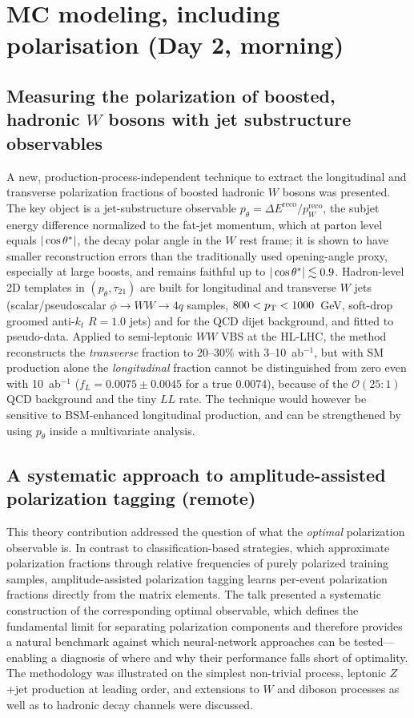 \section{MC modeling, including polarisation (Day 2, morning)}

\subsection{Measuring the polarization of boosted, hadronic $W$ bosons with jet substructure observables}
A new, production-process-independent technique to extract the longitudinal and
transverse polarization fractions of boosted hadronic $W$ bosons was presented.
The key object is a jet-substructure observable $p_\theta =
\Delta E^{\mathrm{reco}}/p_W^{\mathrm{reco}}$, the subjet energy difference
normalized to the fat-jet momentum, which at parton level equals $|\cos\theta^{*}|$,
the decay polar angle in the $W$ rest frame; it is shown to have smaller
reconstruction errors than the traditionally used opening-angle proxy,
especially at large boosts, and remains faithful up to $|\cos\theta^{*}|\lesssim0.9$.
Hadron-level 2D templates in $(p_\theta,\tau_{21})$ are built for longitudinal
and transverse $W$ jets (scalar/pseudoscalar $\phi\to WW\to 4q$ samples,
$800<p_{\mathrm{T}}<1000$~GeV, soft-drop groomed anti-$k_t$ $R=1.0$ jets) and for the QCD
dijet background, and fitted to pseudo-data. Applied to semi-leptonic $WW$ VBS
at the HL-LHC, the method reconstructs the \emph{transverse} fraction to
20--30\% with 3--10~ab$^{-1}$, but with SM production alone the
\emph{longitudinal} fraction cannot be distinguished from zero even with
10~ab$^{-1}$ ($f_L = 0.0075 \pm 0.0045$ for a true 0.0074), because of the
$\mathcal{O}(25{:}1)$ QCD background and the tiny $LL$ rate. The technique
would however be sensitive to BSM-enhanced longitudinal production, and can be
strengthened by using $p_\theta$ inside a multivariate analysis.

\subsection{A systematic approach to amplitude-assisted polarization tagging (remote)}
This theory contribution addressed the question of what the \emph{optimal}
polarization observable is. In contrast to classification-based strategies,
which approximate polarization fractions through relative frequencies of purely
polarized training samples, amplitude-assisted polarization tagging learns
per-event polarization fractions directly from the matrix elements. The talk
presented a systematic construction of the corresponding optimal observable,
which defines the fundamental limit for separating polarization components and
therefore provides a natural benchmark against which neural-network approaches
can be tested---enabling a diagnosis of where and why their performance falls
short of optimality. The methodology was illustrated on the simplest
non-trivial process, leptonic $Z$+jet production at leading order, and
extensions to $W$ and diboson processes as well as to hadronic decay channels
were discussed.

